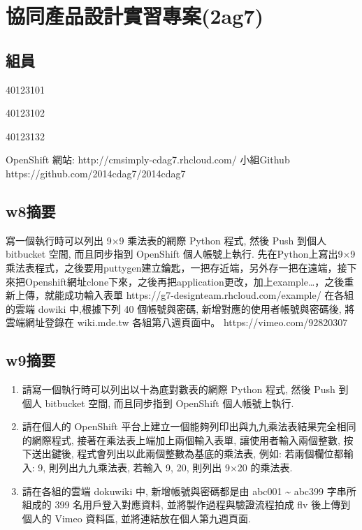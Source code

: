 \documentclass[]{article}
\begin{document}
\section{協同產品設計實習專案(2ag7)}\label{ux5354ux540cux7522ux54c1ux8a2dux8a08ux5be6ux7fd2ux5c08ux68482ag7}

\subsection{組員}\label{ux7d44ux54e1-2}

40123101

40123102

40123132

OpenShift 網站: http://cmsimply-cdag7.rhcloud.com/ 小組Github
https://github.com/2014cdag7/2014cdag7

\subsection{w8摘要}\label{w8ux6458ux8981}

寫一個執行時可以列出 9×9 乘法表的網際 Python 程式, 然後 Push 到個人
bitbucket 空間, 而且同步指到 OpenShift 個人帳號上執行.
先在Python上寫出9×9
乘法表程式，之後要用puttygen建立鑰匙，一把存近端，另外存一把在遠端，接下來把Openshift網址clone下來，之後再把application更改，加上example\ldots{}，之後重新上傳，就能成功輸入表單
https://g7-designteam.rhcloud.com/example/ 在各組的雲端 dowiki
中,根據下列 40 個帳號與密碼, 新增對應的使用者帳號與密碼後,
將雲端網址登錄在 wiki.mde.tw 各組第八週頁面中。
https://vimeo.com/92820307

\subsection{w9摘要}\label{w9ux6458ux8981}

\begin{enumerate}
\def\labelenumi{\arabic{enumi}.}
\item
  請寫一個執行時可以列出以十為底對數表的網際 Python 程式, 然後 Push
  到個人 bitbucket 空間, 而且同步指到 OpenShift 個人帳號上執行.
\item
  請在個人的 OpenShift
  平台上建立一個能夠列印出與九九乘法表結果完全相同的網際程式,
  接著在乘法表上端加上兩個輸入表單, 讓使用者輸入兩個整數, 按下送出鍵後,
  程式會列出以此兩個整數為基底的乘法表, 例如: 若兩個欄位都輸入: 9,
  則列出九九乘法表, 若輸入 9, 20, 則列出 9×20 的乘法表.
\item
  請在各組的雲端 dokuwiki 中, 新增帳號與密碼都是由 abc001
  \textasciitilde{} abc399 字串所組成的 399 名用戶登入對應資料,
  並將製作過程與驗證流程拍成 flv 後上傳到個人的 Vimeo 資料區,
  並將連結放在個人第九週頁面.
\end{enumerate}
\end{document}
